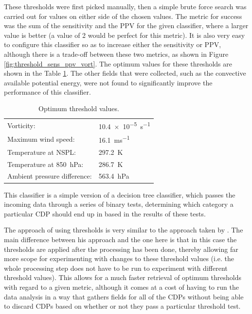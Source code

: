 \documentclass[pdftex,12pt,a4paper]{report}
\begin{document}
These thresholds were first picked manually, then a simple brute force search was carried out for
values on either side of the chosen values. The metric for success was the sum of the sensitivity
and the PPV for the given classifier, where a larger value is better (a value of 2 would be perfect
for this metric). It is also very easy to configure this classifier so as to increase either the
sensitivity or PPV, although there is a trade-off between these two metrics, as shown in Figure
\ref{fig:threshold_sens_ppv_vort}. The optimum values for these thresholds are shown in the
Table \ref{tab:threshold_values}. The other fields that were collected, such as the convective
available potential energy, were not found to significantly improve the performance of this
classifier.

\begin{table}[hb!]
    \centering
    \begin{tabular}{ l l }
        Vorticity: & \SI{10.4e-5}{s^{-1}} \\
        Maximum wind speed: & \SI{16.1}{ms^{-1}} \\
        Temperature at NSPL: & \SI{297.2}{K} \\
        Temperature at \SI{850}{hPa}: & \SI{286.7}{K} \\
        Ambient pressure difference: & \SI{563.4}{hPa} \\
    \end{tabular}
    \caption{Optimum threshold values.}
    \label{tab:threshold_values}
\end{table}

This classifier is a simple version of a decision tree classifier, which passes the incoming data
through a series of binary tests, determining which category a particular CDP should end up in based
in the results of these tests.

The approach of using thresholds is very similar to the approach taken by
\textcite{walsh1997objective}. The main difference between his approach and the one here is that in
this case the thresholds are applied after the processing has been done, thereby allowing far more
scope for experimenting with changes to these threshold values (i.e. the whole processing step does
not have to be run to experiment with different threshold values). This allows for a much faster
retrieval of optimum thresholds with regard to a given metric, although it comes at a cost of having
to run the data analysis in a way that gathers fields for all of the CDPs without being able to
discard CDPs based on whether or not they pass a particular threshold test.
\end{document}
